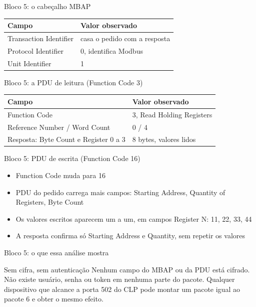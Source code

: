 \documentclass[12pt, aspectratio=169]{beamer}
\newcommand{\tblhead}[1]{\textcolor{TextPrimary}{\textbf{#1}}}
\begin{document}
\begin{frame}{Bloco 5: o cabeçalho MBAP}
  \vspace{0.4cm}
  \begin{tabularx}{\textwidth}{@{}l X@{}}
    \rowcolor{PanelEdge}
    \tblhead{Campo} & \tblhead{Valor observado} \\
    \midrule
    \rowcolor{PanelBg}
    Transaction Identifier & casa o pedido com a resposta \\
    \rowcolor{PanelBg}
    Protocol Identifier & 0, identifica Modbus \\
    \rowcolor{PanelBg}
    Unit Identifier & 1 \\
  \end{tabularx}
\end{frame}

\begin{frame}{Bloco 5: a PDU de leitura (Function Code 3)}
  \vspace{0.4cm}
  \begin{tabularx}{\textwidth}{@{}l X@{}}
    \rowcolor{PanelEdge}
    \tblhead{Campo} & \tblhead{Valor observado} \\
    \midrule
    \rowcolor{PanelBg}
    Function Code & 3, Read Holding Registers \\
    \rowcolor{PanelBg}
    Reference Number / Word Count & 0 / 4 \\
    \rowcolor{PanelBg}
    Resposta: Byte Count e Register 0 a 3 & 8 bytes, valores lidos \\
  \end{tabularx}
\end{frame}

\begin{frame}{Bloco 5: PDU de escrita (Function Code 16)}
  \vspace{0.4cm}
  \begin{itemize}
    \item Function Code muda para 16
    \item PDU do pedido carrega mais campos: Starting Address, Quantity of Registers, Byte Count
    \item Os valores escritos aparecem um a um, em campos Register N: 11, 22, 33, 44
    \item A resposta confirma só Starting Address e Quantity, sem repetir os valores
  \end{itemize}
\end{frame}

\begin{frame}{Bloco 5: o que essa análise mostra}
  \begin{block}{Sem cifra, sem autenticação}
    Nenhum campo do MBAP ou da PDU está cifrado.
    Não existe usuário, senha ou token em nenhuma parte do pacote.
    Qualquer dispositivo que alcance a porta 502 do CLP pode montar
    um pacote igual ao pacote 6 e obter o mesmo efeito.
  \end{block}
\end{frame}
\end{document}
